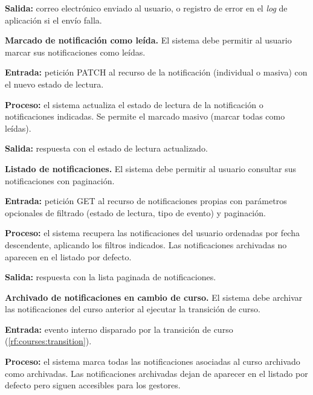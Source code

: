 \begin{functional}
    \textbf{Salida:} correo electrónico enviado al usuario, o registro de error en el
    \textit{log} de aplicación si el envío falla.

    \item \textbf{Marcado de notificación como leída.}
    \label{rf:notifications:read}
    El sistema debe permitir al usuario marcar sus notificaciones como leídas.

    \textbf{Entrada:} petición PATCH al recurso de la notificación (individual o masiva) con
    el nuevo estado de lectura.

    \textbf{Proceso:} el sistema actualiza el estado de lectura de la notificación o
    notificaciones indicadas. Se permite el marcado masivo (marcar todas como leídas).

    \textbf{Salida:} respuesta con el estado de lectura actualizado.

    \item \textbf{Listado de notificaciones.} \label{rf:notifications:list}
    El sistema debe permitir al usuario consultar sus notificaciones con paginación.

    \textbf{Entrada:} petición GET al recurso de notificaciones propias con parámetros
    opcionales de filtrado (estado de lectura, tipo de evento) y paginación.

    \textbf{Proceso:} el sistema recupera las notificaciones del usuario ordenadas por fecha
    descendente, aplicando los filtros indicados. Las notificaciones archivadas no aparecen
    en el listado por defecto.

    \textbf{Salida:} respuesta con la lista paginada de notificaciones.

    \item \textbf{Archivado de notificaciones en cambio de curso.}
    \label{rf:notifications:archive}
    El sistema debe archivar las notificaciones del curso anterior al ejecutar la transición
    de curso.

    \textbf{Entrada:} evento interno disparado por la transición de curso
    (\cref{rf:courses:transition}).

    \textbf{Proceso:} el sistema marca todas las notificaciones asociadas al curso archivado
    como archivadas. Las notificaciones archivadas dejan de aparecer en el listado por
    defecto pero siguen accesibles para los gestores.


\end{functional}
